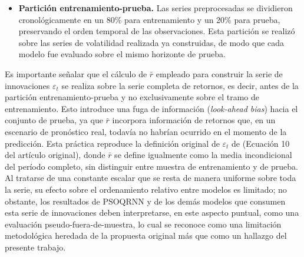 \documentclass[12pt]{paper}
\begin{document}
\begin{itemize}
    Esta característica del estimador tiene una implicación directa sobre la comparación entre modelos que se desarrolla más adelante y que se retoma en las conclusiones: los modelos difieren en su capacidad estructural para reproducir un artefacto de esta naturaleza. Alternativas como los estimadores de ponderación exponencial, que asignan menor peso a las observaciones más antiguas y eliminan la caída abrupta, o el uso de la propia volatilidad condicional de un modelo GARCH como variable de referencia, permitirían mitigar el problema; su exploración se plantea como línea de trabajo futuro. Con esta salvedad presente, la serie de volatilidad realizada aquí definida constituye la variable objetivo de los tres modelos evaluados.

    \item \textbf{Partición entrenamiento-prueba.} Las series preprocesadas se dividieron cronológicamente en un 80\% para entrenamiento y un 20\% para prueba, preservando el orden temporal de las observaciones. Esta partición se realizó sobre las series de volatilidad realizada ya construidas, de modo que cada modelo fue evaluado sobre el mismo horizonte de prueba.
\end{itemize}

Es importante señalar que el cálculo de $\bar{r}$ empleado para construir la serie de innovaciones $\varepsilon_t$ se realiza sobre la serie completa de retornos, es decir, antes de la partición entrenamiento-prueba y no exclusivamente sobre el tramo de entrenamiento. Esto introduce una fuga de información (\textit{look-ahead bias}) hacia el conjunto de prueba, ya que $\bar{r}$ incorpora información de retornos que, en un escenario de pronóstico real, todavía no habrían ocurrido en el momento de la predicción. Esta práctica reproduce la definición original de $\varepsilon_t$ de \citet{pradeepkumar2017forecasting} (Ecuación 10 del artículo original), donde $\bar r$ se define igualmente como la media incondicional del período completo, sin distinguir entre muestra de entrenamiento y de prueba. Al tratarse de una constante escalar que se resta de manera uniforme sobre toda la serie, su efecto sobre el ordenamiento relativo entre modelos es limitado; no obstante, los resultados de PSOQRNN y de los demás modelos que consumen esta serie de innovaciones deben interpretarse, en este aspecto puntual, como una evaluación pseudo-fuera-de-muestra, lo cual se reconoce como una limitación metodológica heredada de la propuesta original más que como un hallazgo del presente trabajo.
\end{document}

